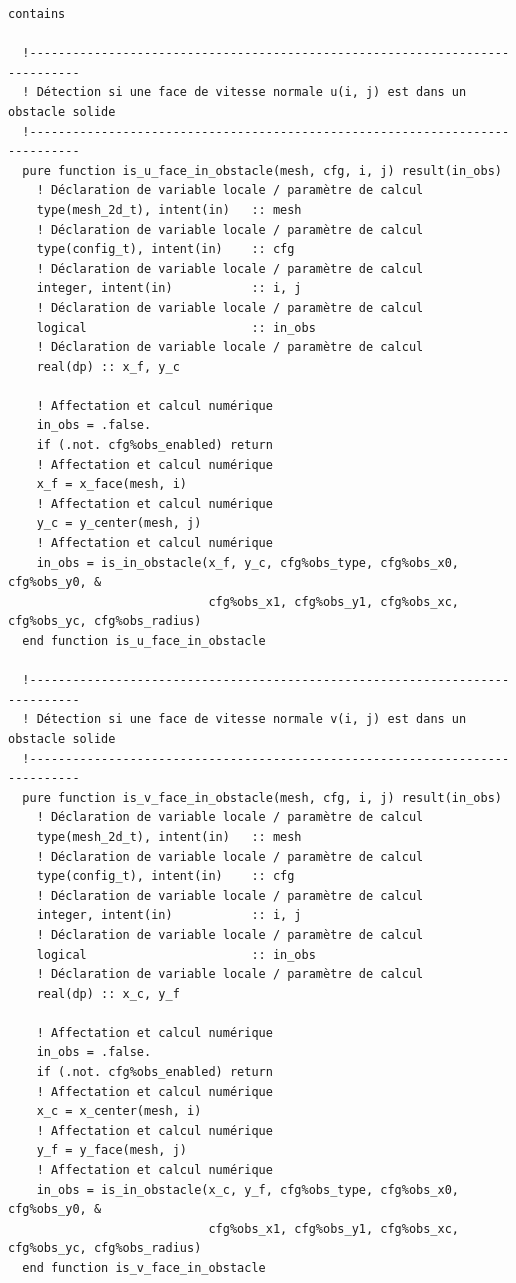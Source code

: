 \documentclass[10pt,a4paper,oneside]{book}
\begin{document}
\begin{lstlisting}[language={[95]Fortran}]
contains

  !-----------------------------------------------------------------------------
  ! Détection si une face de vitesse normale u(i, j) est dans un obstacle solide
  !-----------------------------------------------------------------------------
  pure function is_u_face_in_obstacle(mesh, cfg, i, j) result(in_obs)
    ! Déclaration de variable locale / paramètre de calcul
    type(mesh_2d_t), intent(in)   :: mesh
    ! Déclaration de variable locale / paramètre de calcul
    type(config_t), intent(in)    :: cfg
    ! Déclaration de variable locale / paramètre de calcul
    integer, intent(in)           :: i, j
    ! Déclaration de variable locale / paramètre de calcul
    logical                       :: in_obs
    ! Déclaration de variable locale / paramètre de calcul
    real(dp) :: x_f, y_c

    ! Affectation et calcul numérique
    in_obs = .false.
    if (.not. cfg%obs_enabled) return
    ! Affectation et calcul numérique
    x_f = x_face(mesh, i)
    ! Affectation et calcul numérique
    y_c = y_center(mesh, j)
    ! Affectation et calcul numérique
    in_obs = is_in_obstacle(x_f, y_c, cfg%obs_type, cfg%obs_x0, cfg%obs_y0, &
                            cfg%obs_x1, cfg%obs_y1, cfg%obs_xc, cfg%obs_yc, cfg%obs_radius)
  end function is_u_face_in_obstacle

  !-----------------------------------------------------------------------------
  ! Détection si une face de vitesse normale v(i, j) est dans un obstacle solide
  !-----------------------------------------------------------------------------
  pure function is_v_face_in_obstacle(mesh, cfg, i, j) result(in_obs)
    ! Déclaration de variable locale / paramètre de calcul
    type(mesh_2d_t), intent(in)   :: mesh
    ! Déclaration de variable locale / paramètre de calcul
    type(config_t), intent(in)    :: cfg
    ! Déclaration de variable locale / paramètre de calcul
    integer, intent(in)           :: i, j
    ! Déclaration de variable locale / paramètre de calcul
    logical                       :: in_obs
    ! Déclaration de variable locale / paramètre de calcul
    real(dp) :: x_c, y_f

    ! Affectation et calcul numérique
    in_obs = .false.
    if (.not. cfg%obs_enabled) return
    ! Affectation et calcul numérique
    x_c = x_center(mesh, i)
    ! Affectation et calcul numérique
    y_f = y_face(mesh, j)
    ! Affectation et calcul numérique
    in_obs = is_in_obstacle(x_c, y_f, cfg%obs_type, cfg%obs_x0, cfg%obs_y0, &
                            cfg%obs_x1, cfg%obs_y1, cfg%obs_xc, cfg%obs_yc, cfg%obs_radius)
  end function is_v_face_in_obstacle


\end{lstlisting}
\end{document}
